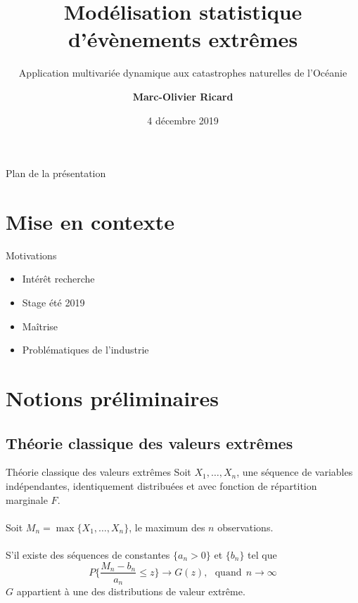 \documentclass[aspectratio=169, 12pt, french]{beamer}
\title[\hyperlink{start}{ACT-2101}]{\Large Modélisation statistique d'évènements extrêmes}
\subtitle{\normalsize Application multivariée dynamique aux catastrophes naturelles de l'Océanie}
\author{\large \textbf{Marc-Olivier Ricard}}
\institute{\normalsize Sous la supervision de \\ Marie-Pier Côté}
\date{\normalsize 4 décembre 2019}
\begin{document}
\begin{frame}
\titlepage
\end{frame}


\begin{frame}{Plan de la présentation}
\tableofcontents
\end{frame}

\section{Mise en contexte}



\begingroup
\large
\begin{frame}{Motivations}
\begin{itemize}
	\item Intérêt recherche
	\item Stage été 2019
	\item Maîtrise
	\item Problématiques de l'industrie
\end{itemize}
\end{frame}
\endgroup



\section{Notions préliminaires}

\subsection{Théorie classique des valeurs extrêmes}
\begin{frame}{Théorie classique des valeurs extrêmes}
Soit $X_1,\dots, X_n$, une séquence de variables indépendantes, identiquement distribuées et avec fonction de répartition marginale $F$.  \\~\\ \pause
Soit $M_n = \max\{X_1, \dots, X_n\}$, le maximum des $n$ observations. \\~\\ \pause
S'il existe des séquences de constantes $\{a_n > 0\}$ et $\{b_n\}$ tel que $$P\Bigg\{\frac{M_n - b_n}{a_n} \le z \Bigg\}\to G(z), \ \ \  \text{quand} \ \ {n \to \infty}$$ \pause
$G$ appartient à une des distributions de valeur extrême.\\~\\ 
\end{frame}
\end{document}
